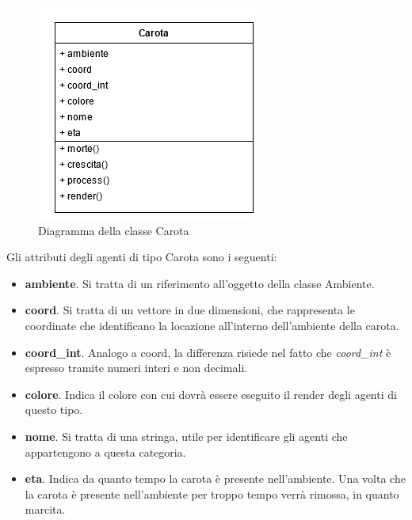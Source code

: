 \documentclass[11pt]{article}
\begin{document}
\begin{figure}[h!]
     \centering
     \includegraphics[scale = 0.7]{Carota.png}
     \caption{Diagramma della classe Carota}
     \label{fig:carotaUML}
\end{figure}
 Gli attributi degli agenti di tipo Carota sono i seguenti: 
\begin{itemize}
    \item \textbf{ambiente}. Si tratta di un riferimento all'oggetto della classe Ambiente. 
    \item \textbf{coord}. Si tratta di un vettore in due dimensioni, che rappresenta le coordinate che identificano la locazione all'interno dell'ambiente della carota. 
    \item \textbf{coord\_int}. Analogo a coord, la differenza risiede nel fatto che \emph{coord\_int} è espresso tramite numeri interi e non decimali. 
    \item \textbf{colore}. Indica il colore con cui dovrà essere eseguito il render degli agenti di questo tipo.
    \item \textbf{nome}. Si tratta di una stringa, utile per identificare gli agenti che appartengono a questa categoria. 
    \item \textbf{eta}. Indica da quanto tempo la carota è presente nell'ambiente. Una volta che la carota è presente nell'ambiente per troppo tempo verrà rimossa, in quanto marcita. 
\end{itemize}
\end{document}
